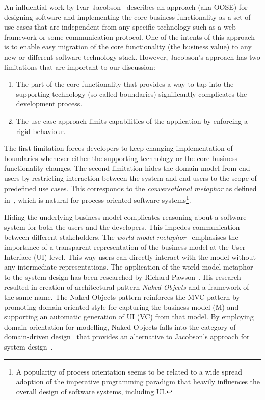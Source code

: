 \documentclass[a4paper,12pt,oneside,openright,final]{memoir} %
\begin{document}
    An influential work by Ivar~Jacobson~\cite{jacobson1992} describes an approach (aka OOSE) for designing software and implementing the core business functionality as a set of use cases that are independent from any specific technology such as a web framework or some communication protocol.
  	One of the intents of this approach is to enable easy migration of the core functionality (the business value) to any new or different software technology stack.
  	However, Jacobson's approach has two limitations that are important to our discussion:
	\begin{enumerate}
   		\item The part of the core functionality that provides a way to tap into the supporting technology (so-called boundaries) significantly complicates the development process.
   		\item The use case approach limits capabilities of the application by enforcing a rigid behaviour.
  	\end{enumerate}
  
	The first limitation forces developers to keep changing implementation of boundaries whenever either the supporting technology or the core business functionality changes.
	The second limitation hides the domain model from end-users by restricting interaction between the system and end-users to the scope of predefined use cases.
	This corresponds to the \emph{conversational metaphor} as defined in~\cite{HHN1986}, which is natural for process-oriented software systems\footnote{A popularity of process orientation seems to be related to a wide spread adoption of the imperative programming paradigm that heavily influences the overall design of software systems, including UI.}.

	Hiding the underlying business model complicates reasoning about a software system for both the users and the developers.
	This impedes communication between different stakeholders.  
	The \emph{world model metaphor}~\cite{HHN1986} emphasises the importance of a transparent representation of the business model at the User Interface (UI) level.
	This way users can directly interact with the model without any intermediate representations.
  	The application of the world model metaphor to the system design has been researched by Richard Pawson~\cite{pawson2001, pawson2004}.
  	His research resulted in creation of architectural pattern \emph{Naked Objects} and a framework of the same name.
  	The Naked Objects pattern reinforces the MVC pattern by promoting domain-oriented style for capturing the business model (M) and supporting an automatic generation of UI (VC) from that model.
  	By employing domain-orientation for modelling, Naked Objects falls into the category of domain-driven design~\cite{haywood2009} that provides an alternative to Jacobson's approach for system design~\cite{evans2003, vernon2013}.
    
\end{document}
